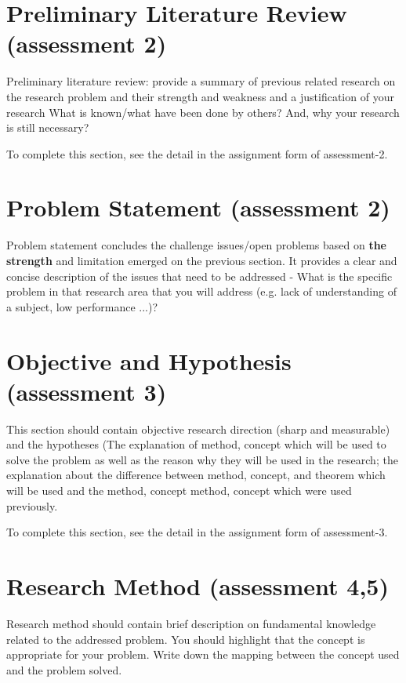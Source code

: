\documentclass{ittelkom}
\begin{document}
\section{Preliminary Literature Review \color{red}(assessment 2)}
Preliminary literature review: provide a summary of previous related research on the research problem and their strength and weakness and a justification of your research \- What is known/what have been done by others? And, why your research is still necessary?

To complete this section, see the detail in the assignment form of assessment-2.

\section{Problem Statement \color{red} (assessment 2)} \label{resquest}
Problem statement concludes the challenge issues/open problems based on {\bf the strength} and limitation emerged on the previous section. It provides a clear and concise description of the issues that need to be addressed - What is the specific problem in that research area that you will address (e.g. lack of understanding of a subject, low performance ...)?

\section{Objective and Hypothesis \color{red}(assessment 3)} \label{hyp}
This section should contain objective research direction (sharp and measurable) and the hypotheses (The explanation of method, concept which will be used to solve the problem as well as the reason why they will be used in the research; the explanation about the difference between method, concept, and theorem which will be used and the method, concept method, concept which were used previously.

To complete this section, see the detail in the assignment form of assessment-3. 



\section{Research Method \color{red}(assessment 4,5)}
Research method should contain brief description on fundamental knowledge related to the addressed problem. You should highlight that the concept is appropriate for your problem. Write down the mapping between the concept used and the problem solved.
\end{document}
